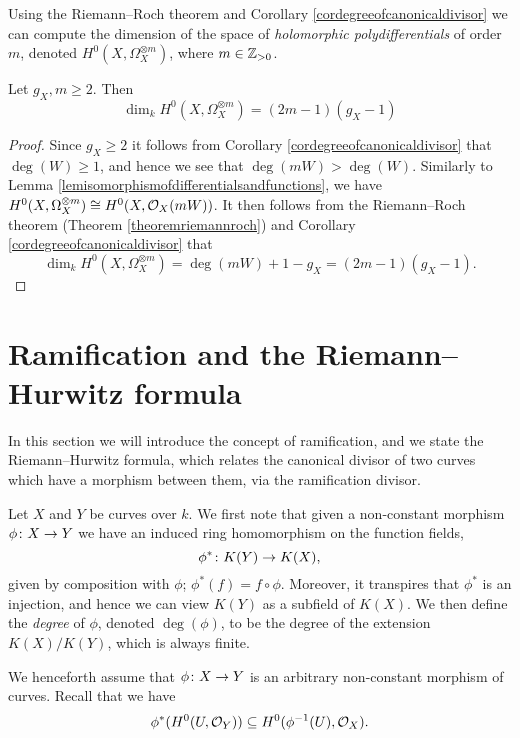 Using the Riemann--Roch theorem and Corollary \ref{cordegreeofcanonicaldivisor} we can compute the dimension of the space of \emph{holomorphic polydifferentials} of order $m$, denoted $H^0(X,\Omega_X^{\otimes m})$, where $m \in {\mathbb Z}_{> 0}$.

    \begin{cor}\label{dim3}
    Let $g_X, m\geq 2$. Then
        \begin{equation*}
        \dim_kH^0(X,\Omega_X^{\otimes m}) = (2m-1)(g_X-1) 
        \end{equation*}
    \end{cor}
    \begin{proof}
    Since $g_X\geq 2$ it follows from Corollary \ref{cordegreeofcanonicaldivisor} that $\deg(W)\geq1$, and hence we see that $\deg(mW)>\deg(W)$.
    Similarly to Lemma \ref{lemisomorphismofdifferentialsandfunctions}, we have $H^0(X,\Omega_X^{\otimes m}) \cong H^0(X,{\cal O}_X(mW))$.
    It then follows from the Riemann--Roch theorem (Theorem \ref{theoremriemannroch}) and Corollary \ref{cordegreeofcanonicaldivisor} that
        \[
        \dim_kH^0(X,\Omega_X^{\otimes m})=\deg(mW)+1-g_X=(2m-1)(g_X-1).
        \]
    \end{proof}


\section{Ramification and the Riemann--Hurwitz formula}

In this section we will introduce the concept of ramification, and we state the Riemann--Hurwitz formula, which relates the canonical divisor of two curves which have a morphism between them, via the ramification divisor.



Let $X$ and $Y$ be curves over $k$.
We first note that given a non-constant morphism $\phi \colon X \rightarrow Y$ we have an induced ring homomorphism on the function fields,
    \[
    \phi^* \colon K(Y) \rightarrow K(X),
    \]
given by composition with $\phi$; \ie $\phi^*(f) = f \circ \phi$.
Moreover, it transpires that $\phi^*$ is an injection, and hence we can view $K(Y)$ as a subfield of $K(X)$.
We then define the \emph{degree} of $\phi$, denoted $\deg(\phi)$, to be the degree of the extension $K(X)/K(Y)$, which is always finite.

We henceforth assume that $\phi \colon X \rightarrow Y$ is an arbitrary non-constant morphism of curves.
Recall that we have
    \[
    \phi^*(H^0(U,{\cal O}_Y)) \subseteq H^0(\phi^{-1}(U),{\cal O}_X).
    \]

